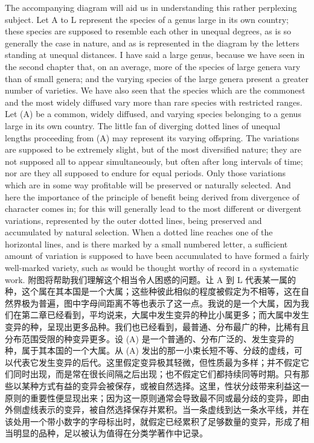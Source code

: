\darwinpair
{The accompanying diagram will aid us in understanding this rather perplexing subject. Let A to L represent the species of a genus large in its own country; these species are supposed to resemble each other in unequal degrees, as is so generally the case in nature, and as is represented in the diagram by the letters standing at unequal distances. I have said a large genus, because we have seen in the second chapter that, on an average, more of the species of large genera vary than of small genera; and the varying species of the large genera present a greater number of varieties. We have also seen that the species which are the commonest and the most widely diffused vary more than rare species with restricted ranges. Let (A) be a common, widely diffused, and varying species belonging to a genus large in its own country. The little fan of diverging dotted lines of unequal lengths proceeding from (A) may represent its varying offspring. The variations are supposed to be extremely slight, but of the most diversified nature; they are not supposed all to appear simultaneously, but often after long intervals of time; nor are they all supposed to endure for equal periods. Only those variations which are in some way profitable will be preserved or naturally selected. And here the importance of the principle of benefit being derived from divergence of character comes in; for this will generally lead to the most different or divergent variations, represented by the outer dotted lines, being preserved and accumulated by natural selection. When a dotted line reaches one of the horizontal lines, and is there marked by a small numbered letter, a sufficient amount of variation is supposed to have been accumulated to have formed a fairly well-marked variety, such as would be thought worthy of record in a systematic work.}
{附图将帮助我们理解这个相当令人困惑的问题。让 A 到 L 代表某一属的种，这个属在其本国是一个大属；这些种彼此相似的程度被假定为不相等，这在自然界极为普遍，图中字母间距离不等也表示了这一点。我说的是一个大属，因为我们在第二章已经看到，平均说来，大属中发生变异的种比小属更多；而大属中发生变异的种，呈现出更多品种。我们也已经看到，最普通、分布最广的种，比稀有且分布范围受限的种变异更多。设 (A) 是一个普通的、分布广泛的、发生变异的种，属于其本国的一个大属。从 (A) 发出的那一小束长短不等、分歧的虚线，可以代表它发生变异的后代。这里假定变异极其轻微，但性质最为多样；并不假定它们同时出现，而是常在很长间隔之后出现；也不假定它们都持续同等时期。只有那些以某种方式有益的变异会被保存，或被自然选择。这里，性状分歧带来利益这一原则的重要性便显现出来；因为这一原则通常会导致最不同或最分歧的变异，即由外侧虚线表示的变异，被自然选择保存并累积。当一条虚线到达一条水平线，并在该处用一个带小数字的字母标出时，就假定已经累积了足够数量的变异，形成了相当明显的品种，足以被认为值得在分类学著作中记录。}

